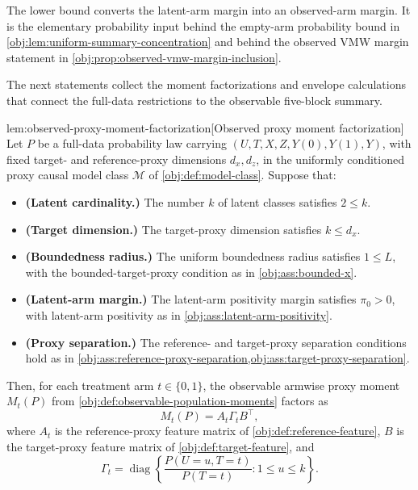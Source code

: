 The lower bound converts the latent-arm margin into an observed-arm margin. It is the elementary probability input behind the empty-arm probability bound in \cref{obj:lem:uniform-summary-concentration} and behind the observed VMW margin statement in \cref{obj:prop:observed-vmw-margin-inclusion}.

The next statements collect the moment factorizations and envelope calculations that connect the full-data restrictions to the observable five-block summary.

\begin{lemmav}{lem:observed-proxy-moment-factorization}[Observed proxy moment factorization]
Let \(P\) be a full-data probability law carrying \((U,T,X,Z,Y(0),Y(1),Y)\), with fixed target- and reference-proxy dimensions \(d_x,d_z\), in the uniformly conditioned proxy causal model class \(\mathcal M\) of \cref{obj:def:model-class}. Suppose that:
\begin{itemize}
\item \textbf{(Latent cardinality.)} The number \(k\) of latent classes satisfies \(2\le k\).
\item \textbf{(Target dimension.)} The target-proxy dimension satisfies \(k\le d_x\).
\item \textbf{(Boundedness radius.)} The uniform boundedness radius satisfies \(1\le L\), with the bounded-target-proxy condition as in \cref{obj:ass:bounded-x}.
\item \textbf{(Latent-arm margin.)} The latent-arm positivity margin satisfies \(\pi_0>0\), with latent-arm positivity as in \cref{obj:ass:latent-arm-positivity}.
\item \textbf{(Proxy separation.)} The reference- and target-proxy separation conditions hold as in \cref{obj:ass:reference-proxy-separation,obj:ass:target-proxy-separation}.
\end{itemize}
Then, for each treatment arm \(t\in\{0,1\}\), the observable armwise proxy moment \(M_t(P)\) from \cref{obj:def:observable-population-moments} factors as
\[
M_t(P)=A_t\Gamma_t B^\top,
\]
where \(A_t\) is the reference-proxy feature matrix of \cref{obj:def:reference-feature}, \(B\) is the target-proxy feature matrix of \cref{obj:def:target-feature}, and
\[
\Gamma_t
=
\operatorname{diag}\left\{
\frac{P(U=u,T=t)}{P(T=t)}:1\le u\le k
\right\}.
\]
\end{lemmav}

